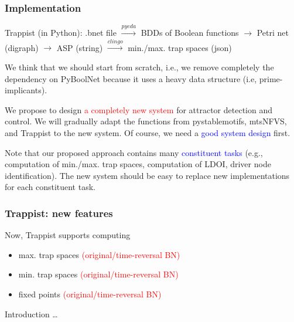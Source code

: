 \documentclass{beamer}              %
\newcommand{\blue}[1]{\textcolor{blue}{#1}}
\newcommand{\red}[1]{\textcolor{red}{#1}}
\begin{document}
\begin{frame}
\frametitle{Implementation}






Trappist (in Python): .bnet file \(\xrightarrow{pyeda}\) BDDs of Boolean functions \(\xrightarrow{}\) Petri net (digraph) \(\xrightarrow{}\) ASP (string) \(\xrightarrow{clingo}\) min./max. trap spaces (json)

\hspace{0.8cm}

We think that we should start from scratch, i.e., we remove completely the dependency on PyBoolNet because it uses a heavy data structure (i.e, prime-implicants).

\hspace{0.8cm}

We propose to design \red{a completely new system} for attractor detection and control.
We will gradually adapt the functions from pystablemotifs, mtsNFVS, and Trappist to the new system.
Of course, we need a \blue{good system design} first.

\hspace{0.8cm}

Note that our proposed approach contains many \blue{constituent tasks} (e.g., computation of min./max. trap spaces, computation of LDOI, driver node identification).
The new system should be easy to replace new implementations for each constituent task.

\end{frame}

\begin{frame}
\frametitle{Trappist: new features}

Now, Trappist supports computing
\begin{itemize}
  \item max. trap spaces \red{(original/time-reversal BN)}
  \item min. trap spaces \red{(original/time-reversal BN)}
  \item fixed points \red{(original/time-reversal BN)}
\end{itemize}

\hspace{0.8cm}

Introduction \dots

\end{frame}
\end{document}
